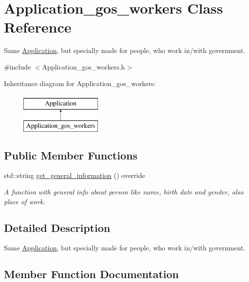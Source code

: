 \hypertarget{classApplication__gos__workers}{}\section{Application\+\_\+gos\+\_\+workers Class Reference}
\label{classApplication__gos__workers}


Same \mbox{\hyperlink{classApplication}{Application}}, but specially made for people, who work in/with government.  




{\ttfamily \#include $<$Application\+\_\+gos\+\_\+workers.\+h$>$}

Inheritance diagram for Application\+\_\+gos\+\_\+workers\+:\begin{figure}[H]
\begin{center}
\leavevmode
\includegraphics[height=2.000000cm]{classApplication__gos__workers}
\end{center}
\end{figure}
\subsection*{Public Member Functions}
\begin{DoxyCompactItemize}
\item 
std\+::string \mbox{\hyperlink{classApplication__gos__workers_ab9600d95a2de52c0b25a5f29c9da5cd5}{get\+\_\+general\+\_\+information}} () override
\begin{DoxyCompactList}\small\item\em A function with general info about person like name, birth date and gender, also place of work. \end{DoxyCompactList}\end{DoxyCompactItemize}


\subsection{Detailed Description}
Same \mbox{\hyperlink{classApplication}{Application}}, but specially made for people, who work in/with government. 

\subsection{Member Function Documentation}
\mbox{\label{classApplication__gos__workers_ab9600d95a2de52c0b25a5f29c9da5cd5}} 
